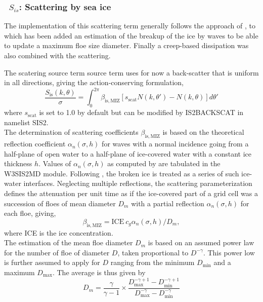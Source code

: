 \vsssub
\subsubsection{~$S_{is}$: Scattering by sea ice} \label{sec:IS2}
\vsssub


\noindent
The implementation of this scattering term generally 
follows the approach of \cite{art:MM06}, to which has been added an estimation of the breakup of the ice 
by waves to be able to update a maximum floe size diameter. Finally a creep-based dissipation was also 
combined with the scattering.  

\noindent 
The scatering source term source term uses for now a back-scatter that is uniform in 
all directions,  giving the action-conserving formulation, 
\begin{equation}
 \frac{S_{\mathrm{is}}(k,\theta)}{\sigma} =  \int_0^{2\pi}\beta_{\mathrm{is},\mathrm{MIZ}} [s_\mathrm{scat}  N(k,\theta')-N(k,\theta)] d\theta'  
 \end{equation}
where $s_\mathrm{scat}$ is set to 1.0 by default but can be modified by 
{\code IS2BACKSCAT} in namelist SIS2. \\

\noindent
The determination of scattering coefficients  $\beta_{\mathrm{is},\mathrm{MIZ}}$ is based on the theoretical 
reflection coefficient $\alpha_n(\sigma,h)$
for waves with a normal incidence going from a half-plane of open water to a half-plane of ice-covered water with a 
constant ice thickness $h$.  Values of $\alpha_n(\sigma,h)$ as computed by \cite{art:KM08} are tabulated 
in the {\code W3SIS2MD} module. Following \cite{art:Dea11}, the broken ice is treated as a series of 
such ice-water interfaces. Neglecting multiple reflections, the scattering parameterization defines the attenuation 
per unit time as if the ice-covered part of a grid cell was a succession of floes of mean diameter $D_{m}$ with a partial 
reflection $\alpha_n(\sigma,h)$ for each floe, giving, 
\begin{equation}
\beta_{\mathrm{is},\mathrm{MIZ}}=\mathrm{ICE}~c_g \alpha_n(\sigma,h) / D_{m},
 \end{equation}
where ICE is the ice concentration. \\
 
\noindent
The estimation of the mean floe diameter $D_m$ is based on an assumed power law for the number of 
floe of diameter $D$, taken  proportional to $D^{-\gamma}$. This power low is further assumed to 
apply for $D$ ranging from 
the minimum $D_{\min}$ and a maximum $D_{\max}$. The average is thus given by  
\begin{equation}
D_m=\frac{\gamma}{\gamma -1}\times\frac{D_{\max}^{-\gamma +1}-D_{\min}^{-\gamma +1}}{D_{\max}^{-\gamma}-D_{\min}^{-\gamma}}
\label{analytic_Dbar}
\end{equation}

